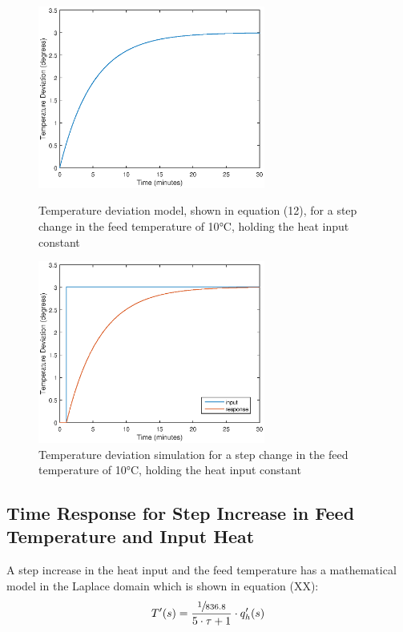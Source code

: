 \documentclass{article}
\begin{document}
\begin{figure}[h]
\begin{minipage}{0.45\textwidth}
\centering
\includegraphics[height=6cm]{1b_mod}
\caption{Temperature deviation model, shown in equation (12), for a step change in the feed temperature of 10$\si{\degreeCelsius}$, holding the heat input constant}
\end{minipage}
\hspace{1cm}
\begin{minipage}{0.45\textwidth}
\centering
\includegraphics[height=6cm]{1b_sim}
\caption{Temperature deviation simulation for a step change in the feed temperature of 10$\si{\degreeCelsius}$, holding the heat input constant}
\end{minipage}
\end{figure}

\subsection{Time Response for Step Increase in Feed Temperature and Input Heat}

A step increase in the heat input and the feed temperature has a mathematical model in the Laplace domain which is shown in equation (XX):
\begin{align}
T'(s) = \frac{\sfrac{1}{836.8}}{5 \cdot \tau + 1} \cdot q'_h(s)
\end{align} 
\end{document}
